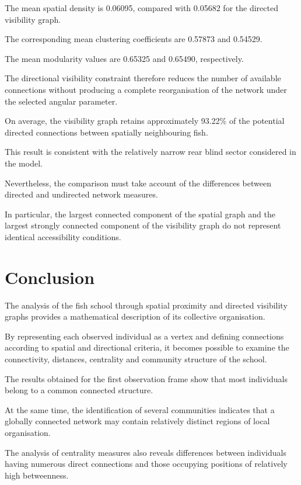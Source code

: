 \documentclass[10pt,a4paper]{article}
\begin{document}
The mean spatial density is 0.06095,
compared with 0.05682 for the directed
visibility graph.

The corresponding mean clustering
coefficients are 0.57873 and 0.54529.

The mean modularity values are
0.65325 and 0.65490, respectively.

The directional visibility constraint
therefore reduces the number of
available connections without producing
a complete reorganisation of the network
under the selected angular parameter.

On average, the visibility graph retains
approximately 93.22\% of the potential
directed connections between spatially
neighbouring fish.

This result is consistent with the
relatively narrow rear blind sector
considered in the model.

Nevertheless, the comparison must
take account of the differences
between directed and undirected
network measures.

In particular, the largest connected
component of the spatial graph and
the largest strongly connected
component of the visibility graph
do not represent identical
accessibility conditions.


\section{Conclusion}

The analysis of the fish school through
spatial proximity and directed visibility
graphs provides a mathematical description
of its collective organisation.

By representing each observed individual
as a vertex and defining connections
according to spatial and directional
criteria, it becomes possible to examine
the connectivity, distances, centrality
and community structure of the school.

The results obtained for the first
observation frame show that most
individuals belong to a common
connected structure.

At the same time, the identification
of several communities indicates
that a globally connected network
may contain relatively distinct
regions of local organisation.

The analysis of centrality measures
also reveals differences between
individuals having numerous direct
connections and those occupying
positions of relatively high
betweenness.
\end{document}
